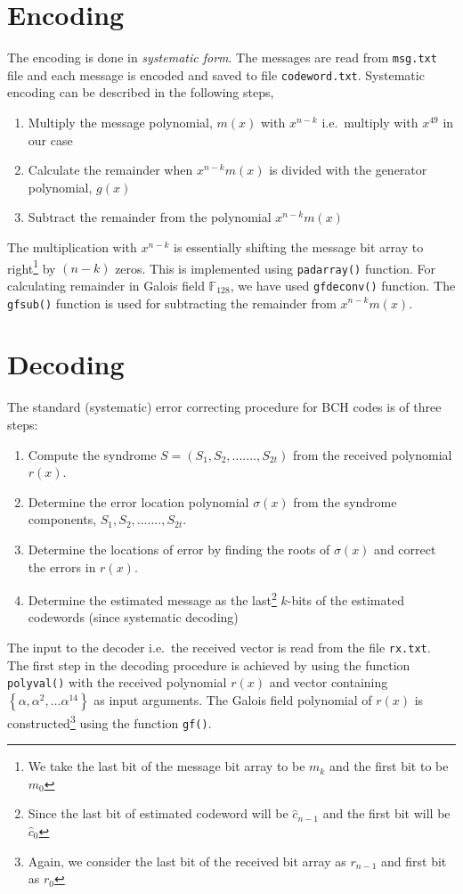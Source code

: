 \documentclass[10 pt]{article}
\begin{document}
\section{Encoding}
The encoding is done in \textit{systematic form}. The messages are read from \texttt{msg.txt} file and each message is encoded and saved to file \texttt{codeword.txt}. Systematic encoding can be described in the following steps,
\renewcommand{\labelenumi}{(\roman{enumi})}
\begin{enumerate}
	\item Multiply the message polynomial, $m(x)$ with $x^{n-k}$ i.e.\ multiply with $x^{49}$ in our case
    \item Calculate the remainder when $x^{n-k}m(x)$ is divided with the generator polynomial, $g(x)$
    \item Subtract the remainder from the polynomial $x^{n-k}m(x)$
\end{enumerate}
The multiplication with $x^{n-k}$ is essentially shifting the message bit array to right\footnote{We take the last bit of the message bit array to be $m_{k}$ and the first bit to be $m_{0}$} by $(n-k)$ zeros. This is implemented using \texttt{padarray()} function. For calculating remainder in Galois field $\mathbb{F}_{128}$, we have used \texttt{gfdeconv()} function. The \texttt{gfsub()} function is used for subtracting the remainder from $x^{n-k}m(x)$.

\section{Decoding}
The standard (systematic) error correcting procedure for BCH codes is of three steps: 
\renewcommand{\labelenumi}{(\roman{enumi})}
\begin{enumerate}
	\item Compute the syndrome $S = (S_1, S_2,.......,S_{2t})$ from the received polynomial $r(x)$.
	\item Determine the error location polynomial $\sigma(x)$ from the syndrome components, $S_1, S_2,.......,S_{2t}$.
	\item Determine the locations of error by finding the roots of $\sigma(x)$ and correct the errors in $r(x)$.
    \item Determine the estimated message as the last\footnote{Since the last bit of estimated codeword will be $\hat{c}_{n-1}$ and the first bit will be $\hat{c}_{0}$} $k$-bits of the estimated codewords (since systematic decoding)
\end{enumerate}
The input to the decoder i.e.\ the received vector is read from the file \texttt{rx.txt}. The first step in the decoding procedure is achieved by using the function \texttt{polyval()} with the received polynomial $r(x)$ and vector containing $\left\lbrace \alpha, \alpha^{2}, \hdots \alpha^{14} \right\rbrace$ as input arguments. The Galois field polynomial of $r(x)$ is constructed\footnote{Again, we consider the last bit of the received bit array as $r_{n-1}$ and first bit as $r_{0}$} using the function \texttt{gf()}.
\end{document}
